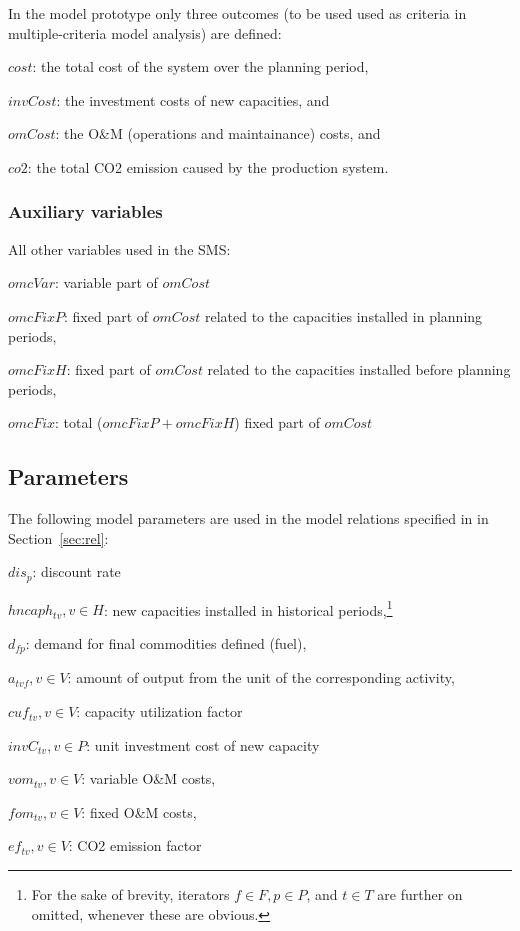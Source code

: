 \documentclass[a4paper,12pt]{article}
\begin{document}
In the model prototype only three outcomes (to be used used as criteria in
multiple-criteria model analysis) are defined:
\btlb
\item $cost$: the total cost of the system over the planning period,
\item $invCost$: the investment costs of new capacities, and
\item $omCost$: the O\&M (operations and maintainance) costs, and
\item $co2$: the total CO2 emission caused by the production system.
\etl

\begin{comment}
\subsubsection{State variables}
The variables defining the state of the system:
\btlb
\item \dots (to be defined, if needed).
\etl
\end{comment}

\subsubsection{Auxiliary variables}
All other variables used in the SMS:
\btlb
\item $omcVar$: variable part of $omCost$
\item $omcFixP$: fixed part of $omCost$ related to the capacities installed in
	planning periods,
\item $omcFixH$: fixed part of $omCost$ related to the capacities installed
	before planning periods,
\item $omcFix$: total ($omcFixP + omcFixH$) fixed part of $omCost$
\etl

\subsection{Parameters}
The following model parameters are used in the model relations 
specified in in Section~\ref{sec:rel}:
\btlb
\item $dis_p$: discount rate
\item $hncaph_{tv}, v \in H$: new capacities installed in historical
	periods,\footnote{For the sake of brevity, iterators $f \in F, p \in P$,
	and $t \in T$ are further on omitted, whenever these are obvious.}
\item $d_{fp}$: demand for final commodities defined (fuel),
\item $a_{tvf}, v \in V$: amount of output from the unit of the corresponding activity,
\item $cuf_{tv}, v \in V$: capacity utilization factor
\item $invC_{tv}, v \in P$: unit investment cost of new capacity
\item $vom_{tv}, v \in V$: variable O\&M costs,
\item $fom_{tv}, v \in V$: fixed O\&M costs,
\item $ef_{tv}, v \in V$: CO2 emission factor
\end{document}
